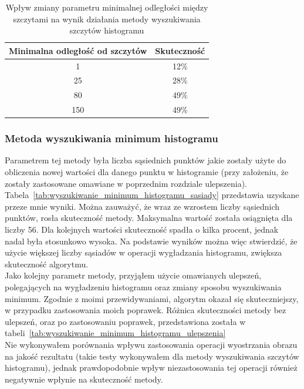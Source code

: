 \begin {table}
  \begin{center}
    \begin{tabular}{c | c}
      Minimalna odległość od szczytów & Skuteczność \\
      \hline
      1 & 12\% \\
      25 & 28\% \\
      80 & 49\% \\
      150 & 49\%
    \end{tabular}
    \caption {Wpływ zmiany parametru minimalnej odległości między szczytami na wynik działania metody wyszukiwania szczytów histogramu}
    \label{tab:wyszukiwanie_szczytow_dystans} 
  \end{center}
\end {table}

\subsubsection{Metoda wyszukiwania minimum histogramu}
Parametrem tej metody była liczba sąsiednich punktów jakie zostały użyte do obliczenia nowej wartości dla danego punktu w histogramie (przy założeniu, że zostały zastosowane omawiane w poprzednim rozdziale ulepszenia). Tabela~\ref{tab:wyszukiwanie_minimum_histogramu_sasiady} przedstawia uzyskane przeze mnie wyniki. Można zauważyć, że wraz ze wzrostem liczby sąsiednich punktów, rosła skuteczność metody. Maksymalna wartość została osiągnięta dla liczby 56. Dla kolejnych wartości skuteczność spadła o kilka procent, jednak nadal była stosunkowo wysoka. Na podstawie wyników można więc stwierdzić, że użycie większej liczby sąsiadów w operacji wygładzania histogramu, zwiększa skuteczność algorytmu. \\
Jako kolejny parametr metody, przyjąłem użycie omawianych ulepszeń, polegających na wygładzeniu histogramu oraz zmiany sposobu wyszukiwania minimum. Zgodnie z moimi przewidywaniami, algorytm okazał się skuteczniejszy, w przypadku zastosowania moich poprawek. Różnica skuteczności metody bez ulepszeń, oraz po zastosowaniu poprawek, przedstawiona została w tabeli~\ref{tab:wyszukiwanie_minimum_histogramu_ulepszenia} \\
Nie wykonywałem porównania wpływu zastosowania operacji wyostrzania obrazu na jakość rezultatu (takie testy wykonywałem dla metody wyszukiwania szczytów histogramu), jednak prawdopodobnie wpływ niezastosowania tej operacji również negatywnie wpłynie na skuteczność metody.


